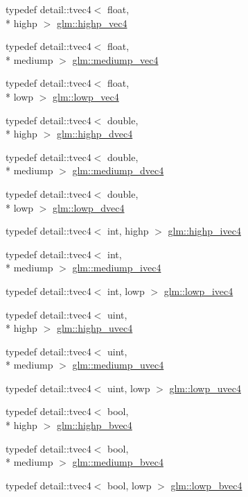 \begin{DoxyCompactItemize}
typedef detail\-::tvec4$<$ float, \\*
highp $>$ \hyperlink{group__core__precision_gae32d5f99860247afbe7ed90564bceac1}{glm\-::highp\-\_\-vec4}
\item 
typedef detail\-::tvec4$<$ float, \\*
mediump $>$ \hyperlink{group__core__precision_ga2527a7f322907fecd58bef0a7a9c3ecd}{glm\-::mediump\-\_\-vec4}
\item 
typedef detail\-::tvec4$<$ float, \\*
lowp $>$ \hyperlink{group__core__precision_ga706ad1296c1cdcbd26c815fbb0f3f846}{glm\-::lowp\-\_\-vec4}
\item 
typedef detail\-::tvec4$<$ double, \\*
highp $>$ \hyperlink{group__core__precision_gad5ff5ff4a69e6925f5b4f540e2633835}{glm\-::highp\-\_\-dvec4}
\item 
typedef detail\-::tvec4$<$ double, \\*
mediump $>$ \hyperlink{group__core__precision_gac61cf2fc2df895e5f277c978dace042a}{glm\-::mediump\-\_\-dvec4}
\item 
typedef detail\-::tvec4$<$ double, \\*
lowp $>$ \hyperlink{group__core__precision_gad04432e5d5accf764e10c6674e5d0c96}{glm\-::lowp\-\_\-dvec4}
\item 
typedef detail\-::tvec4$<$ int, highp $>$ \hyperlink{group__core__precision_gaeba08fcf78aeae954c3335d73500ff8b}{glm\-::highp\-\_\-ivec4}
\item 
typedef detail\-::tvec4$<$ int, \\*
mediump $>$ \hyperlink{group__core__precision_gaa4c23a132d76436e041747b0c03265ad}{glm\-::mediump\-\_\-ivec4}
\item 
typedef detail\-::tvec4$<$ int, lowp $>$ \hyperlink{group__core__precision_gab9b404ae623385d5094499d2d4e4616d}{glm\-::lowp\-\_\-ivec4}
\item 
typedef detail\-::tvec4$<$ uint, \\*
highp $>$ \hyperlink{group__core__precision_ga7cb8cc501f7e680e1889b93eb80e6c46}{glm\-::highp\-\_\-uvec4}
\item 
typedef detail\-::tvec4$<$ uint, \\*
mediump $>$ \hyperlink{group__core__precision_gad90c29c2643136a9bcb1165eac47c810}{glm\-::mediump\-\_\-uvec4}
\item 
typedef detail\-::tvec4$<$ uint, lowp $>$ \hyperlink{group__core__precision_ga17b5f652e5c64b0034065420d844fca7}{glm\-::lowp\-\_\-uvec4}
\item 
typedef detail\-::tvec4$<$ bool, \\*
highp $>$ \hyperlink{group__core__precision_ga381539af52c5e5c659700e12fb706eaf}{glm\-::highp\-\_\-bvec4}
\item 
typedef detail\-::tvec4$<$ bool, \\*
mediump $>$ \hyperlink{group__core__precision_ga8bb7cfe902e2cb356450d211ca4d58e2}{glm\-::mediump\-\_\-bvec4}
\item 
typedef detail\-::tvec4$<$ bool, lowp $>$ \hyperlink{group__core__precision_ga24c651dc8cb20779b3773428aef4f7f4}{glm\-::lowp\-\_\-bvec4}
\end{DoxyCompactItemize}



